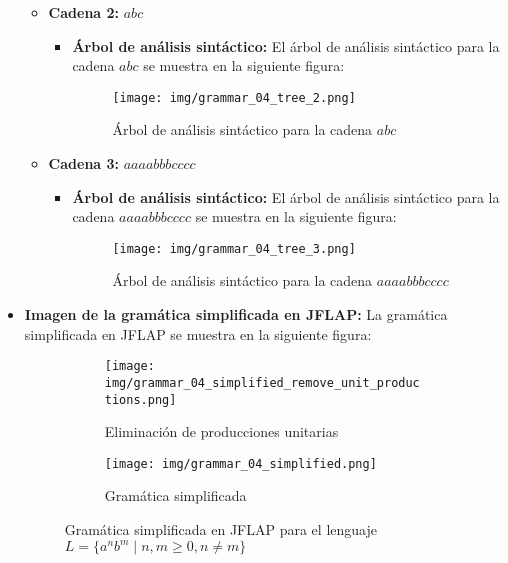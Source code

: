 \documentclass[11pt]{report}
\begin{document}
\begin{itemize}
\begin{itemize}
    \item \textbf{Cadena 2:} $abc$
    \begin{itemize}
      \item \textbf{Árbol de análisis sintáctico:} El árbol de análisis sintáctico para la cadena $abc$ se muestra en la siguiente figura:
      \begin{figure}[H]
        \centering
        \texttt{[image: img/grammar\_04\_tree\_2.png]}
        \caption{Árbol de análisis sintáctico para la cadena $abc$}
        \label{fig:arbol11}
      \end{figure}
    \end{itemize}
    \item \textbf{Cadena 3:} $aaaabbbcccc$
    \begin{itemize}
      \item \textbf{Árbol de análisis sintáctico:} El árbol de análisis sintáctico para la cadena $aaaabbbcccc$ se muestra en la siguiente figura:
      \begin{figure}[H]
        \centering
        \texttt{[image: img/grammar\_04\_tree\_3.png]}
        \caption{Árbol de análisis sintáctico para la cadena $aaaabbbcccc$}
        \label{fig:arbol12}
      \end{figure}
    \end{itemize}
  \end{itemize}
  \item \textbf{Imagen de la gramática simplificada en JFLAP:} La gramática simplificada en JFLAP se muestra en la siguiente figura:
  \begin{figure}[H]
    \begin{subfigure}{0.5\textwidth}
      \centering
      \texttt{[image: img/grammar\_04\_simplified\_remove\_unit\_productions.png]}
      \caption{Eliminación de producciones unitarias}
    \end{subfigure}%
    \begin{subfigure}{0.5\textwidth}
      \centering
      \texttt{[image: img/grammar\_04\_simplified.png]}
      \caption{Gramática simplificada}
    \end{subfigure}
    \caption{Gramática simplificada en JFLAP para el lenguaje $L = \{a^n b^m \mid n, m \geq 0, n \neq m\}$}
  \end{figure}
\end{itemize}

\newpage

\end{document}

